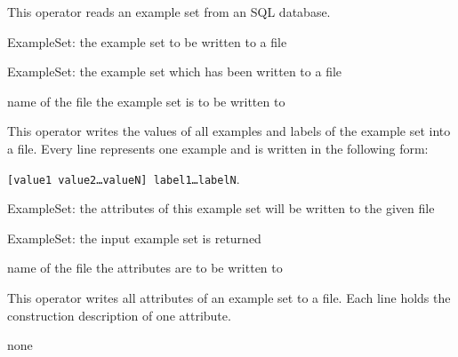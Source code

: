\opdescr This operator reads an example set from an {SQL} database.




\begin{opin}
\item[ExampleSet:] the example set to be written to a file
\end{opin}

\begin{opout}
\item[ExampleSet:] the example set which has been written to a file
\end{opout}

\begin{parameters}
 name of the file the example set is to be written to
\end{parameters}

\opdescr This operator writes the values of all examples and labels of the
example set into a file. Every line represents one example and
is written in the following form:
\begin{center}
\texttt{[value1 value2\ldots valueN] label1\ldots labelN}.
\end{center}



\begin{opin}
\item[ExampleSet:] the attributes of this example set will be written
  to the given file
\end{opin}

\begin{opout}
\item [ExampleSet:] the input example set is returned
\end{opout}


\begin{parameters}
 name of the file the attributes are to be written to
\end{parameters}

\opdescr This operator writes all attributes of an example set to a file. Each line holds the
construction description of one attribute. 



\begin{opin}
\item none
\end{opin}

